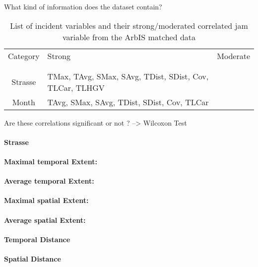 What kind of information does the dataset contain?

\noindent
\begin{table}[h!]
	\centering
	\begin{tabular}{c|l|l}  
		Category & Strong & Moderate \\
		\\[-1em]
		\hline
		\\[-1em]
		Strasse & TMax, TAvg, SMax, SAvg, TDist, SDist, Cov, TLCar, TLHGV & \\ 
 		Month & TAvg, SMax, SAvg, TDist, SDist, Cov, TLCar & \\
	\end{tabular}
	\caption{List of incident variables and their strong/moderated correlated jam variable from the ArbIS matched data}
\end{table}

Are these correlations significant or not ? --> Wilcoxon Test

\paragraph{Strasse}

\paragraph{Maximal temporal Extent:}
\paragraph{Average temporal Extent:}
\paragraph{Maximal spatial Extent:}
\paragraph{Average spatial Extent:}
\paragraph{Temporal Distance}
\paragraph{Spatial Distance}

